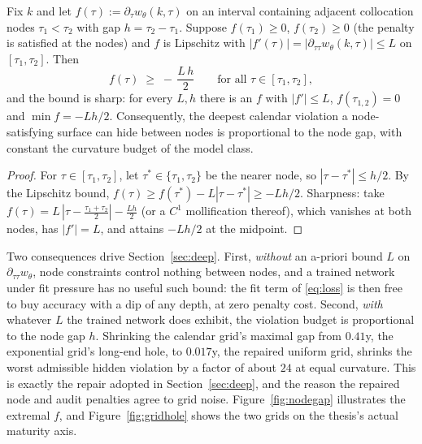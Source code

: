 \begin{theorem}\label{prop:nodegap}
Fix $k$ and let $f(\tau):=\partial_\tau w_\theta(k,\tau)$ on an interval containing adjacent
collocation nodes $\tau_1<\tau_2$ with gap $h=\tau_2-\tau_1$. Suppose $f(\tau_1)\ge0$,
$f(\tau_2)\ge0$ (the penalty is satisfied at the nodes) and $f$ is Lipschitz with
$|f'(\tau)|=|\partial_{\tau\tau}w_\theta(k,\tau)|\le L$ on $[\tau_1,\tau_2]$. Then
\[
f(\tau)\;\ge\;-\,\frac{L\,h}{2}\qquad\text{for all }\tau\in[\tau_1,\tau_2],
\]
and the bound is sharp: for every $L,h$ there is an $f$ with $|f'|\le L$, $f(\tau_{1,2})=0$
and $\min f=-Lh/2$. Consequently, the deepest calendar violation a node-satisfying surface can
hide between nodes is proportional to the node gap, with constant the curvature budget of the
model class.
\end{theorem}

\begin{proof}
For $\tau\in[\tau_1,\tau_2]$, let $\tau^\ast\in\{\tau_1,\tau_2\}$ be the nearer node, so
$|\tau-\tau^\ast|\le h/2$. By the Lipschitz bound,
$f(\tau)\ge f(\tau^\ast)-L|\tau-\tau^\ast|\ge-Lh/2$. Sharpness: take
$f(\tau)=L\,|\tau-\tfrac{\tau_1+\tau_2}{2}|-\tfrac{Lh}{2}$ (or a $C^1$ mollification thereof),
which vanishes at both nodes, has $|f'|=L$, and attains $-Lh/2$ at the midpoint.
\end{proof}

\begin{remark}\label{rem:nodegapread}
Two consequences drive Section~\ref{sec:deep}. First, \emph{without} an a-priori bound $L$ on
$\partial_{\tau\tau}w_\theta$, node constraints control nothing between nodes, and a trained
network under fit pressure has no useful such bound: the fit term of \eqref{eq:loss} is then
free to buy accuracy with a dip of any depth, at zero penalty cost. Second, \emph{with}
whatever $L$ the trained network does exhibit, the violation budget is proportional to the node
gap $h$. Shrinking the calendar grid's maximal gap from $0.41$y, the exponential grid's
long-end hole, to $0.017$y, the repaired uniform grid, shrinks the worst admissible hidden
violation by a factor of about $24$ at equal curvature. This is exactly the repair adopted in
Section~\ref{sec:deep}, and the reason the repaired node and audit penalties agree to grid
noise. Figure~\ref{fig:nodegap} illustrates the extremal $f$, and Figure~\ref{fig:gridhole}
shows the two grids on the thesis's actual maturity axis.
\end{remark}

